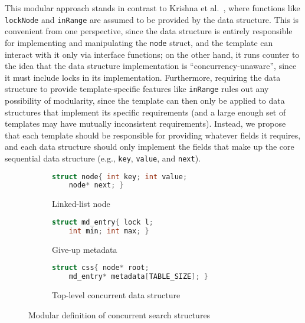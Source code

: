 \documentclass[sigplan,screen]{acmart}
\begin{document}
This modular approach stands in contrast to Krishna et al.~\cite{templates}, where functions like \lstinline{lockNode} and \lstinline{inRange} are assumed to be provided by the data structure. This is convenient from one perspective, since the data structure is entirely responsible for implementing and manipulating the \lstinline{node} struct, and the template can interact with it only via interface functions; on the other hand, it runs counter to the idea that the data structure implementation is ``concurrency-unaware'', since it must include locks in its implementation. Furthermore, requiring the data structure to provide template-specific features like \lstinline{inRange} rules out any possibility of modularity, since the template can then only be applied to data structures that implement its specific requirements (and a large enough set of templates may have mutually inconsistent requirements). Instead, we propose that each template should be responsible for providing whatever fields it requires, and each data structure should only implement the fields that make up the core sequential data structure (e.g., \lstinline{key}, \lstinline{value}, and \lstinline{next}).

\begin{figure}
  \begin{subfigure}[t]{.4\textwidth}
  \begin{lstlisting}[language=C, style=myStyle]
  struct node{ int key; int value;
    node* next; }
  \end{lstlisting}
    \caption{Linked-list node}
  \end{subfigure}
  \hfill
  \begin{subfigure}[t]{.4\textwidth}
  \begin{lstlisting}[language=C, style=myStyle]
  struct md_entry{ lock l;
    int min; int max; }
  \end{lstlisting}
    \caption{Give-up metadata}
  \end{subfigure}

  \medskip

  \begin{subfigure}[t]{.4\textwidth}
  \begin{lstlisting}[language=C, style=myStyle,numbers=none]
  struct css{ node* root;
    md_entry* metadata[TABLE_SIZE]; }
  \end{lstlisting}
    \caption{Top-level concurrent data structure}
  \end{subfigure}
  \caption{Modular definition of concurrent search structures}
  \label{node-md}
\end{figure}
\end{document}
